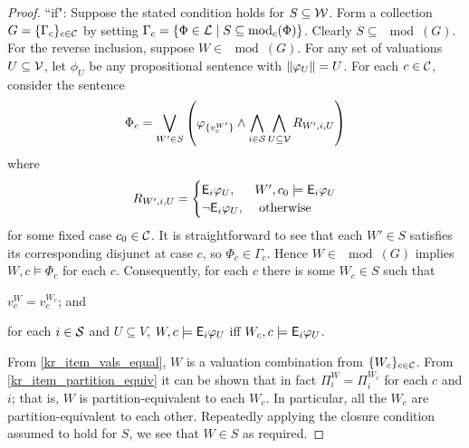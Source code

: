 \begin{proof}
    ``if": Suppose the stated condition holds for $S \subseteq \mathcal{W}$. Form a
    collection $G = \{\Gamma_c\}_{c \in \mathcal{C}}$ by setting $\Gamma_c = \{\Phi \in
    \mathcal{L}{} \mid S \subseteq \operatorname{mod}_c(\Phi)\}$. Clearly $S \subseteq \mod(G)$. For the
    reverse inclusion, suppose $W \in \mod(G)$. For any set of valuations $U
    \subseteq \mathcal{V}$, let $\phi_U$ be any propositional sentence with
    $\|{\varphi_U}\| = U$. For each $c \in \mathcal{C}$, consider the sentence
    \[
        \Phi_c = \bigvee_{W' \in S}\left(
            \varphi_{\{v^{W'}_c\}}
            \land
            \bigwedge_{i \in \mathcal{S}}
                \bigwedge_{U \subseteq \mathcal{V}}
                    R_{W', i, U}
        \right)
    \]
    where
    \[
        R_{W', i, U} = \begin{cases}
            \mathsf{E}_i{\varphi_U},& W', c_0 \models \mathsf{E}_i{\varphi_U} \\
            \neg \mathsf{E}_i{\varphi_U},& \text{ otherwise }
        \end{cases}
    \]
    for some fixed case $c_0 \in \mathcal{C}$. It is straightforward to see that each
    $W' \in S$ satisfies its corresponding disjunct at case $c$, so $\Phi_c \in
    \Gamma_c$. Hence $W \in \mod(G)$ implies $W, c \models \Phi_c$ for each $c$.
    Consequently, for each $c$ there is some $W_c \in S$ such that
    \begin{inlinelist}
        \item \label{kr_item_vals_equal} $v^W_c = v^{W_c}_c$; and
        \item \label{kr_item_partition_equiv} for each $i \in \mathcal{S}$ and $U \subseteq
              V$, $W, c \models \mathsf{E}_i{\varphi_U}$ iff $W_c, c \models \mathsf{E}_i{\varphi_U}$.
    \end{inlinelist}
    From \ref{kr_item_vals_equal}, $W$ is a valuation combination from $\{W_c\}_{c
    \in \mathcal{C}}$. From \ref{kr_item_partition_equiv} it can be shown that in fact
    $\Pi^W_i = \Pi^{W_c}_i$ for each $c$ and $i$; that is, $W$ is
    partition-equivalent to each $W_c$. In particular, all the $W_c$ are
    partition-equivalent to each other.
    Repeatedly applying the closure condition assumed to hold for $S$, we see
    that $W \in S$ as required.


\end{proof}
